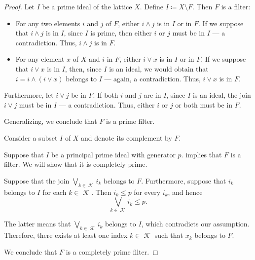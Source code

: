 \begin{proof}
   Let \( I \) be a prime ideal of the lattice \( X \). Define \( I \coloneqq X \setminus F \). Then \( F \) is a filter:
  \begin{itemize}
    \item For any two elements \( i \) and \( j \) of \( F \), either \( i \wedge j \) is in \( I \) or in \( F \). If we suppose that \( i \wedge j \) is in \( I \), since \( I \) is prime, then either \( i \) or \( j \) must be in \( I \) --- a contradiction. Thus, \( i \wedge j \) is in \( F \).

    \item For any element \( x \) of \( X \) and \( i \) in \( F \), either \( i \vee x \) is in \( I \) or in \( F \). If we suppose that \( i \vee x \) is in \( I \), then, since \( I \) is an ideal, we would obtain that \( i = i \wedge (i \vee x) \) belongs to \( I \) --- again, a contradiction. Thus, \( i \vee x \) is in \( F \).
  \end{itemize}

  Furthermore, let \( i \vee j \) be in \( F \). If both \( i \) and \( j \) are in \( I \), since \( I \) is an ideal, the join \( i \vee j \) must be in \( I \) --- a contradiction. Thus, either \( i \) or \( j \) or both must be in \( F \).

  Generalizing, we conclude that \( F \) is a prime filter.

   Consider a subset \( I \) of \( X \) and denote its complement by \( F \).

  \SufficiencySubProof* Suppose that \( I \) be a principal prime ideal with generator \( p \).  implies that \( F \) is a filter. We will show that it is completely prime.

  Suppose that the join \( \bigvee_{k \in \mscrK} i_k \) belongs to \( F \). Furthermore, suppose that \( i_k \) belongs to \( I \) for each \( k \in \mscrK \). Then \( i_k \leq p \) for every \( i_k \), and hence
  \begin{equation*}
    \bigvee_{k \in \mscrK} i_k \leq p.
  \end{equation*}

  The latter means that \( \bigvee_{k \in \mscrK} i_k \) belongs to \( I \), which contradicts our assumption. Therefore, there exists at least one index \( k \in \mscrK \) such that \( x_k \) belongs to \( F \).

  We conclude that \( F \) is a completely prime filter.


\end{proof}
